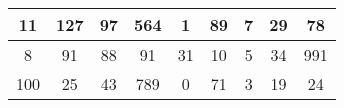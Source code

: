 \documentclass{article}
\begin{document}
\begin{table}[h!]
\begin{tabular}{|c|c|c|c|c|c|c|c|c|}
\hline
11 & 127 & 97 & 564 & 1 & 89 & 7 & 29 & 78 \\ \hline
8 & 91 & 88 & 91 & 31 & 10 & 5 & 34 & 991 \\ \hline
100 & 25 & 43 & 789 & 0 & 71 & 3 & 19 & 24 \\ \hline
\end{tabular}
\end{table}
\end{document}
